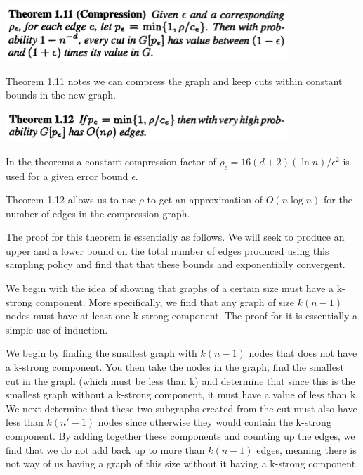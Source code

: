 \documentclass[11pt]{article}
\begin{document}
\begin{center}
\includegraphics[width=0.8\textwidth]{figures/Thm1_11.png}
\end{center}

Theorem 1.11 notes we can compress the graph and keep cuts within constant bounds in the new graph.

\begin{center}
\includegraphics[width=0.8\textwidth]{figures/Thm1_12.png}
\end{center}

In the theorems a constant compression factor of $\rho_\epsilon = 16(d+2)(\ln n)/\epsilon^2$ is used for a given error bound $\epsilon$.

Theorem 1.12 allows us to use $\rho$ to get an approximation of $O(n\log n)$ for the number of edges in the compression graph. 

The proof for this theorem is essentially as follows. We will seek to produce an upper and a lower bound on the total number of edges produced using this sampling policy and find that that these bounds and exponentially convergent.

We begin with the idea of showing that graphs of a certain size must have a k-strong component. More specifically, we find that any graph of size $k(n-1)$ nodes must have at least one k-strong component. The proof for it is essentially a simple use of induction. 

We begin by finding the smallest graph with $k(n-1)$ nodes that does not have a k-strong component. You then take the nodes in the graph, find the smallest cut in the graph (which must be less than k) and determine that since this is the smallest graph without a k-strong component, it must have a value of less than k. We next determine that these two subgraphs created from the cut must also have less than $k(n'-1)$ nodes since otherwise they would contain the k-strong component. By adding together these components and counting up the edges, we find that we do not add back up to more than $k(n-1)$ edges, meaning there is not way of us having a graph of this size without it having a k-strong component.
\end{document}

